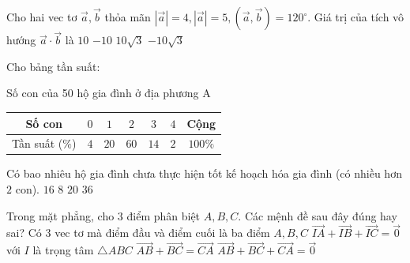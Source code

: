 \begin{ex}%
    Cho hai vec tơ $\overrightarrow{a}, \overrightarrow{b}$ thỏa mãn $\left|\overrightarrow{a}\right|=4, |\overrightarrow{a}|=5, \left(\vec{a}, \vec{b}\right)=120^{\circ}$. Giá trị của tích vô hướng $\overrightarrow{a} \cdot \overrightarrow{b}$ là
    \choice
    {$10$}
    {\True $-10$}
    {$10\sqrt{3}$}
    {$-10\sqrt{3}$}
\end{ex}
\begin{ex}%
    Cho bảng tần suất:
    \begin{center}
        Số con của 50 hộ gia đình ở địa phương A\\
        \begin{tabular}{|c|c|c|c|c|c|c|}
        \hline Số con & $0$ & $1$ & $2$ & $3$ & $4$ & Cộng \\
        \hline Tần suất ($\%$) & $4$ & $20$ & $60$ & $14$ & $2$ & $100 \%$ \\
        \hline
        \end{tabular}
    \end{center}
    Có bao nhiêu hộ gia đình chưa thực hiện tốt kế hoạch hóa gia đình (có nhiều hơn $2$ con).
    \choice
    {$16$}
    {\True $8$}
    {$20$}
    {$36$}
\end{ex}
\cauds
\begin{ex}%
	Trong mặt phẳng, cho $3$ điểm phân biệt $A, B, C$. Các mệnh đề sau đây đúng hay sai?
	\choiceTF
	{Có $3$ vec tơ mà điểm đầu và điểm cuối là ba điểm $A, B, C$}
	{\True $\overrightarrow{IA}+\overrightarrow{IB}+\overrightarrow{IC}=\overrightarrow{0}$ với $I$ là trọng tâm $\triangle ABC$}
	{$\overrightarrow{AB}+\overrightarrow{BC}=\overrightarrow{CA}$}
	{\True $\overrightarrow{AB}+\overrightarrow{BC}+\overrightarrow{CA}=\overrightarrow{0}$}
\end{ex}
